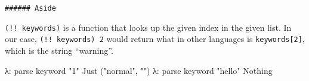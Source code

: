 \documentclass[]{article}
\newenvironment{Shaded}{}{}
\newcommand{\DataTypeTok}[1]{\textcolor[rgb]{0.56,0.13,0.00}{{#1}}}
\newcommand{\StringTok}[1]{\textcolor[rgb]{0.25,0.44,0.63}{{#1}}}
\newcommand{\OtherTok}[1]{\textcolor[rgb]{0.00,0.44,0.13}{{#1}}}
\newcommand{\FunctionTok}[1]{\textcolor[rgb]{0.02,0.16,0.49}{{#1}}}
\newcommand{\NormalTok}[1]{{#1}}
\begin{document}
\begin{Shaded}
\end{Shaded}

\begin{verbatim}
###### Aside
\end{verbatim}

\texttt{(!!\ keywords)} is a function that looks up the given index in
the given list. In our case, \texttt{(!!\ keywords)\ 2} would return
what in other languages is \texttt{keywords{[}2{]}}, which is the string
``warning''.

\begin{Shaded}
\begin{Highlighting}[]
\NormalTok{λ}\FunctionTok{:} \NormalTok{parse keyword }\StringTok{"1"}
\DataTypeTok{Just} \NormalTok{(}\StringTok{"normal"}\NormalTok{, }\StringTok{""}\NormalTok{)}
\NormalTok{λ}\FunctionTok{:} \NormalTok{parse keyword }\StringTok{"hello"}
\DataTypeTok{Nothing}
\end{Highlighting}
\end{Shaded}
\end{document}
